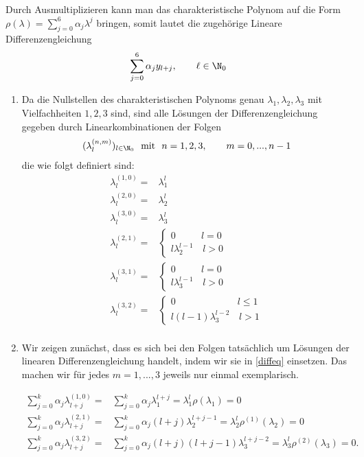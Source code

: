 \begin{solution}
Durch Ausmultiplizieren kann man das charakteristische Polynom auf die Form $\rho(\lambda) = \sum_{j=0}^{6}\alpha_j \lambda^j$ bringen, somit lautet die zugehörige Lineare Differenzengleichung
\begin{align}\label{diffeq}
  \sum_{j=0}^{6} \alpha_j y_{l+j}, \qquad \ell \in \N_0
\end{align}
\begin{enumerate}[label = \textbf{\alph*)}]
  \item Da die Nullstellen des charakteristischen Polynoms genau $\lambda_1,\lambda_2,\lambda_3$
  mit Vielfachheiten $1,2,3$ sind, sind
  alle Lösungen der Differenzengleichung gegeben durch Linearkombinationen der Folgen
  \begin{align*}
    (\lambda_{l}^{(n,m)})_{l \in \N_0} \text{~~mit~~} n = 1,2,3, \qquad m = 0,...,n-1
  \end{align*}
  die wie folgt definiert sind:
  \begin{align*}
    \lambda_{l}^{(1,0)} =& \lambda_1^l \\
    \lambda_{l}^{(2,0)} =& \lambda_2^l \\
    \lambda_{l}^{(3,0)} =& \lambda_3^l \\
    \lambda_{l}^{(2,1)} =& \begin{cases}
0 & l = 0 \\
l \lambda_2^{l-1} & \, l > 0
\end{cases} \\
    \lambda_{l}^{(3,1)} =& \begin{cases}
0 & l = 0 \\
l \lambda_3^{l-1} & \, l > 0
\end{cases} \\
    \lambda_{l}^{(3,2)} =& \begin{cases}
0 & l \leq 1 \\
l(l-1) \lambda_3^{l-2} & \, l > 1
\end{cases} \\
  \end{align*}

  \item Wir zeigen zunächst, dass es sich bei den Folgen tatsächlich um Lösungen der linearen Differenzengleichung handelt, indem wir sie in \eqref{diffeq} einsetzen. Das machen wir für jedes $m=1,...,3$ jeweils nur einmal exemplarisch.

  \begin{align*}
    \sum_{j=0}^{k} \alpha_j \lambda_{l+j}^{(1,0)} =& \sum_{j=0}^{k} \alpha_j \lambda_1^{l+j} = \lambda_1^l \rho(\lambda_1) = 0 \\
    \sum_{j=0}^{k} \alpha_j \lambda_{l+j}^{(2,1)} =& \sum_{j=0}^{k} \alpha_j (l+j)\lambda_2^{l+j-1} = \lambda_2^l\rho^{(1)}(\lambda_2) = 0 \\
    \sum_{j=0}^{k} \alpha_j \lambda_{l+j}^{(3,2)} =& \sum_{j=0}^{k} \alpha_j (l+j)(l+j-1)\lambda_3^{l+j-2} = \lambda_3^l\rho^{(2)}(\lambda_3) = 0.
  \end{align*}



\end{enumerate}
\end{solution}
